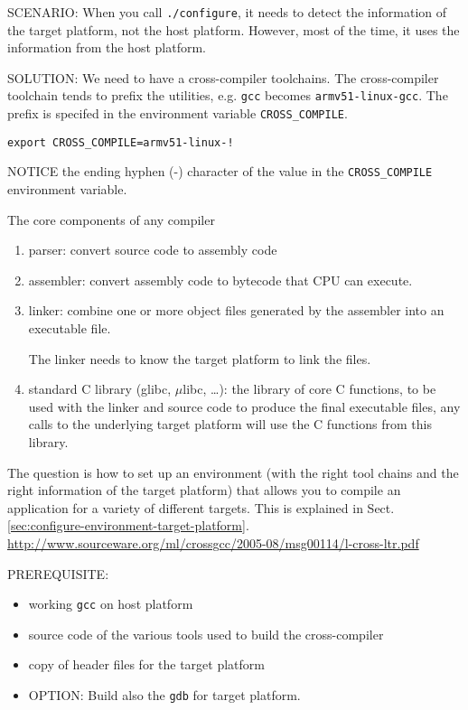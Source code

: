 SCENARIO: When you call \verb!./configure!, it needs to detect the information
of the target platform, not the host platform. However, most of the time,
it uses the information from the host platform.

SOLUTION: We need to have a cross-compiler toolchains.
The cross-compiler toolchain tends to prefix the utilities, e.g. \verb!gcc!
becomes \verb!armv51-linux-gcc!. The prefix is specifed in the environment
variable \verb!CROSS_COMPILE!.
\begin{verbatim}
export CROSS_COMPILE=armv51-linux-!
\end{verbatim}
NOTICE the ending hyphen (-) character of the value in the \verb!CROSS_COMPILE!
environment variable.

\begin{mdframed}
The core components of any compiler
\begin{enumerate}
  \item parser: convert source code to assembly code
  
  \item assembler: convert assembly code to bytecode that CPU can execute.
  
  \item linker: combine one or more object files generated by the assembler
  into an executable file.
  
  The linker needs to know the target platform to link the files.
  
  \item standard C library (glibc, $\mu$libc, \ldots): the library of core C
  functions, to be used with the linker and source code to produce the final
  executable files, any calls to the underlying target platform
  will use the C functions from this library.
  
\end{enumerate}

\end{mdframed}

The question is how to set up an environment (with the right tool chains and the
right information of the target platform) that allows you to compile an
application for a variety of different targets. This is explained in
Sect.\ref{sec:configure-environment-target-platform}.
\url{http://www.sourceware.org/ml/crossgcc/2005-08/msg00114/l-cross-ltr.pdf}



PREREQUISITE:
\begin{itemize}
  \item working \verb!gcc! on host platform
  \item source code of the various tools used to build the cross-compiler
  \item copy of header files for the target platform

  \item OPTION: Build also the \verb!gdb! for target platform.
\end{itemize}

